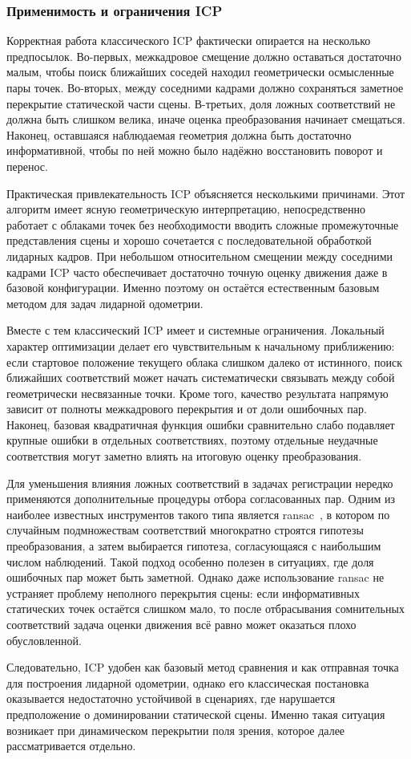 \subsubsection{Применимость и ограничения ICP}

Корректная работа классического ICP фактически опирается на несколько предпосылок. Во-первых, межкадровое смещение должно оставаться достаточно малым, чтобы поиск ближайших соседей находил геометрически осмысленные пары точек. Во-вторых, между соседними кадрами должно сохраняться заметное перекрытие статической части сцены. В-третьих, доля ложных соответствий не должна быть слишком велика, иначе оценка преобразования начинает смещаться. Наконец, оставшаяся наблюдаемая геометрия должна быть достаточно информативной, чтобы по ней можно было надёжно восстановить поворот и перенос.

Практическая привлекательность ICP объясняется несколькими причинами. Этот алгоритм имеет ясную геометрическую интерпретацию, непосредственно работает с облаками точек без необходимости вводить сложные промежуточные представления сцены и хорошо сочетается с последовательной обработкой лидарных кадров. При небольшом относительном смещении между соседними кадрами ICP часто обеспечивает достаточно точную оценку движения даже в базовой конфигурации. Именно поэтому он остаётся естественным базовым методом для задач лидарной одометрии.

Вместе с тем классический ICP имеет и системные ограничения. Локальный характер оптимизации делает его чувствительным к начальному приближению: если стартовое положение текущего облака слишком далеко от истинного, поиск ближайших соответствий может начать систематически связывать между собой геометрически несвязанные точки. Кроме того, качество результата напрямую зависит от полноты межкадрового перекрытия и от доли ошибочных пар. Наконец, базовая квадратичная функция ошибки сравнительно слабо подавляет крупные ошибки в отдельных соответствиях, поэтому отдельные неудачные соответствия могут заметно влиять на итоговую оценку преобразования.

Для уменьшения влияния ложных соответствий в задачах регистрации нередко применяются дополнительные процедуры отбора согласованных пар. Одним из наиболее известных инструментов такого типа является \gls{ransac}~\cite{ransac-pyihub}, в котором по случайным подмножествам соответствий многократно строятся гипотезы преобразования, а затем выбирается гипотеза, согласующаяся с наибольшим числом наблюдений. Такой подход особенно полезен в ситуациях, где доля ошибочных пар может быть заметной. Однако даже использование \gls{ransac} не устраняет проблему неполного перекрытия сцены: если информативных статических точек остаётся слишком мало, то после отбрасывания сомнительных соответствий задача оценки движения всё равно может оказаться плохо обусловленной.

Следовательно, ICP удобен как базовый метод сравнения и как отправная точка для построения лидарной одометрии, однако его классическая постановка оказывается недостаточно устойчивой в сценариях, где нарушается предположение о доминировании статической сцены. Именно такая ситуация возникает при динамическом перекрытии поля зрения, которое далее рассматривается отдельно.
